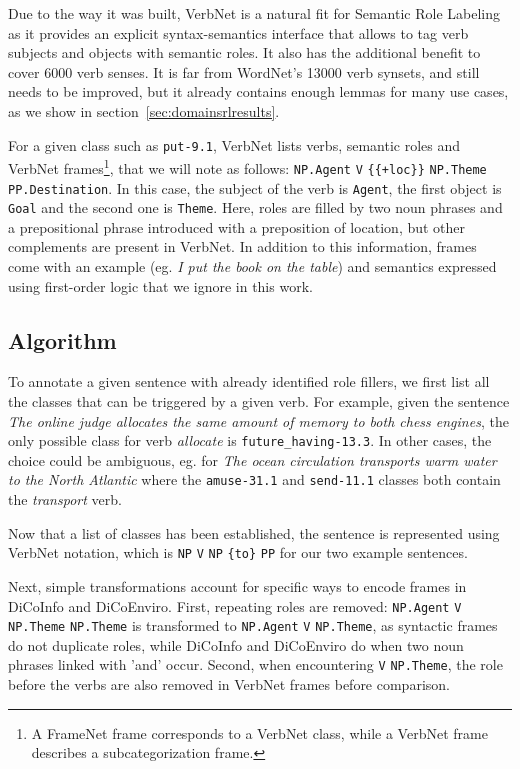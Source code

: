 Due to the way it was built, VerbNet is a natural fit for Semantic Role
Labeling as it provides an explicit syntax-semantics interface that allows to
tag verb subjects and objects with semantic roles. It also has the additional
benefit to cover 6000 verb senses. It is far from WordNet's 13000 verb synsets,
and still needs to be improved, but it already contains enough lemmas for many
use cases, as we show in section~\ref{sec:domainsrlresults}.

For a given class such as \texttt{put-9.1}, VerbNet lists verbs, semantic roles
and VerbNet frames\footnote{A FrameNet frame corresponds to a VerbNet class,
while a VerbNet frame describes a subcategorization frame.}, that we will note
as follows: \texttt{NP.Agent} \texttt{V} \texttt{\{\{+loc\}\}}
\texttt{NP.Theme} \texttt{PP.Destination}. In this case, the subject of the
verb is \texttt{Agent}, the first object is \texttt{Goal} and the second one is
\texttt{Theme}. Here, roles are filled by two noun phrases and a prepositional phrase
introduced with a preposition of location, but other complements are present in
VerbNet. In addition to this information, frames come with an example (eg.
\textit{I put the book on the table}) and semantics expressed using first-order
logic that we ignore in this work.

\subsection{Algorithm}

To annotate a given sentence with already identified role fillers, we first
list all the classes that can be triggered by a given verb. For example, given
the sentence \emph{The online judge allocates the same amount of memory to both
chess engines}, the only possible class for verb \emph{allocate} is
\texttt{future\_having-13.3}. In other cases, the choice could be ambiguous,
eg. for \emph{The ocean circulation transports warm water to the North Atlantic}
where the \texttt{amuse-31.1} and \texttt{send-11.1} classes both contain the
\textit{transport} verb.

Now that a list of classes has been established, the sentence is represented
using VerbNet notation, which is \texttt{NP} \texttt{V} \texttt{NP}
\texttt{\{to\}} \texttt{PP} for our two example sentences.

Next, simple transformations account for specific ways to encode frames in
DiCoInfo and DiCoEnviro. First, repeating roles are removed: \texttt{NP.Agent}
\texttt{V} \texttt{NP.Theme} \texttt{NP.Theme} is transformed to
\texttt{NP.Agent} \texttt{V} \texttt{NP.Theme}, as syntactic frames do not
duplicate roles, while DiCoInfo and DiCoEnviro do when two noun phrases linked
with 'and' occur. Second, when encountering \texttt{V} \texttt{NP.Theme}, the
role before the verbs are also removed in VerbNet frames before comparison.

